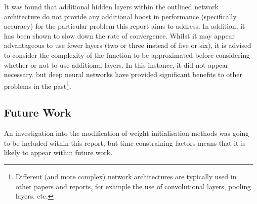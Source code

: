 \documentclass{article}
\begin{document}
It was found that additional hidden layers within the outlined network architecture do not provide any additional boost in performance (specifically accuracy) for the particular problem this report aims to address. In addition, it has been shown to slow down the rate of convergence. Whilst it may appear advantageous to use fewer layers (two or three instead of five or six), it is advised to consider the complexity of the function to be approximated before considering whether or not to use additional layers. In this instance, it did not appear necessary, but deep neural networks have provided significant benefits to other problems in the past\citep{krizhevsky2012imagenet}\footnote{Different (and more complex) network architectures are typically used in other papers and reports, for example the use of convolutional layers, pooling layers, etc.}.

\subsection{Future Work}

An investigation into the modification of weight initialisation methods was going to be included within this report, but time constraining factors means that it is likely to appear within future work.


\end{document}
